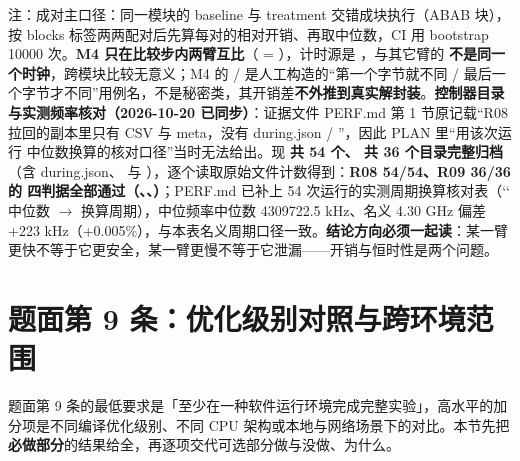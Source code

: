 \documentclass[UTF8,fontset=fandol,11pt,a4paper]{ctexart}
\begin{document}
\begin{landscape}
\noindent 注：成对主口径：同一模块的 baseline 与 treatment 交错成块执行（ABAB 块），按 blocks 标签两两配对后先算每对的相对开销、再取中位数，CI 用 bootstrap 10000 次。\textbf{M4 只在比较步内两臂互比}（\texttt{} = \texttt{}），计时源是 \texttt{}，与其它臂的 \texttt{} \textbf{不是同一个时钟}，跨模块比较无意义；M4 的 \texttt{} / \texttt{} 是人工构造的“第一个字节就不同 / 最后一个字节才不同”用例名，不是秘密类，其开销差\textbf{不外推到真实解封装}。\textbf{控制器目录与实测频率核对（2026-10-20 已同步）}：证据文件 PERF.md 第 1 节原记载“R08 拉回的副本里只有 CSV 与 meta，没有 during.json / \texttt{}”，因此 PLAN 里“用该次运行 \texttt{} 中位数换算的核对口径”当时无法给出。现 \textbf{\texttt{} 共 54 个、\texttt{} 共 36 个目录完整归档}（含 during.json、\texttt{} 与 \texttt{}），逐个读取原始文件计数得到：\textbf{R08 54/54、R09 36/36 的 \texttt{} 四判据全部通过（\texttt{}、\texttt{}、\texttt{}）}；PERF.md 已补上 54 次运行的实测周期换算核对表（`\texttt{}` 中位数 \texorpdfstring{$\rightarrow$}{->} 换算周期），中位频率中位数 4309722.5 kHz、名义 4.30 GHz 偏差 +223 kHz（+0.005\%），与本表名义周期口径一致。\textbf{结论方向必须一起读}：某一臂更快不等于它更安全，某一臂更慢不等于它泄漏——开销与恒时性是两个问题。\par\endgroup\vspace{3mm}\end{landscape}
\section{题面第 9 条：优化级别对照与跨环境范围}
题面第 9 条的最低要求是「至少在一种软件运行环境完成完整实验」，高水平的加分项是不同编译优化级别、不同 CPU 架构或本地与网络场景下的对比。本节先把\textbf{必做部分}的结果给全，再逐项交代可选部分做与没做、为什么。
\end{document}
